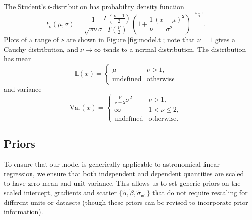 \documentclass[fleqn,usenatbib]{mnras}
\newcommand{\studentt}[2]{t_\nu \left( #1, #2 \right)}
\newcommand{\intercept}{\alpha}
\newcommand{\covariate}{\beta}
\begin{document}
The Student's $t$-distribution has probability density function
\begin{equation}
    \studentt{\mu}{\sigma}
        =
    \frac{1}{\sqrt{\pi \nu} \sigma}
    \frac{
        \Gamma \left(\frac{\nu + 1}2\right)
    }{
        \Gamma \left(\frac{\nu}2\right)
    }
    \left(
        1 + \frac{1}{\nu} \frac{\left(x - \mu\right)^2}{\sigma^2}
    \right)^{
        -\frac{\nu + 1}{2}
    }.
\end{equation}
Plots of a range of $\nu$ are shown in Figure \ref{fig:model.t}; note that $\nu
= 1$ gives a Cauchy distribution, and $\nu \rightarrow \infty$ tends to a normal
distribution. The distribution has mean
\begin{equation}
    \mathbb{E}(x)
        =
    \begin{cases}
        \mu & \nu > 1, \\
        \textrm{undefined} & \textrm{otherwise}
    \end{cases}
\end{equation}
and variance
\begin{equation}
    \mathrm{Var}(x)
        =
    \begin{cases}
        \frac{\nu}{\nu - 2} \sigma^2 & \nu > 1, \\
        \infty & 1 < \nu \leq 2, \\
        \textrm{undefined} & \textrm{otherwise.}
    \end{cases}
\end{equation}

\subsection{Priors}
\label{sec:formalism.prior}

To ensure that our model is generically applicable to astronomical linear
regression, we ensure that both independent and dependent quantities are scaled
to have zero mean and unit variance. This allows us to set generic priors on the
scaled intercept, gradients and scatter $\{\tilde{\intercept},
\tilde{\covariate}, \tilde{\sigma}_{\text{int}}\}$ that do not require rescaling for
different units or datasets (though these priors can be revised to incorporate
prior information).
\end{document}
